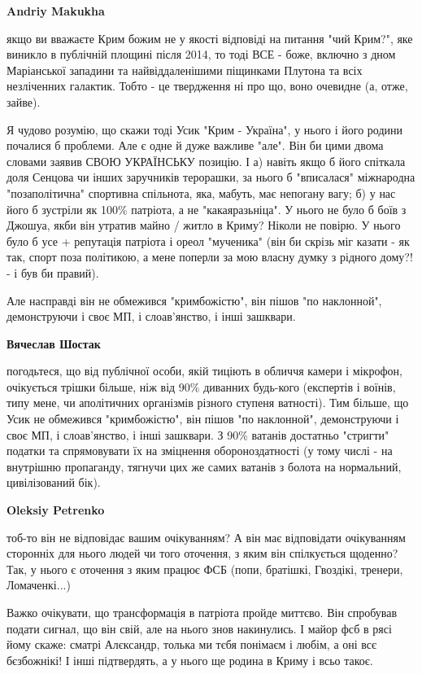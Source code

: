 \begin{itemize}
\begin{itemize}
\textbf{Andriy Makukha} 

якщо ви вважаєте Крим божим не у якості відповіді на питання "чий Крим?", яке
виникло в публічній площині після 2014, то тоді ВСЕ - боже, включно з дном
Маріанської западини та найвіддаленішими піщинками Плутона та всіх незліченних
галактик. Тобто - це твердження ні про що, воно очевидне (а, отже, зайве).

Я чудово розумію, що скажи тоді Усик "Крим - Україна", у нього і його родини
почалися б проблеми. Але є одне й дуже важливе "але". Він би цими двома словами
заявив СВОЮ УКРАЇНСЬКУ позицію. І а) навіть якщо б його спіткала доля Сенцова
чи інших заручників терорашки, за нього б "вписалася" міжнародна
"позаполітична" спортивна спільнота, яка, мабуть, має непогану вагу; б) у нас
його б зустріли як 100\% патріота, а не "какаяразьніца". У нього не було б боїв
з Джошуа, якби він утратив майно / житло в Криму? Ніколи не повірю. У нього
було б усе + репутація патріота і ореол "мученика" (він би скрізь міг казати -
як так, спорт поза політикою, а мене поперли за мою власну думку з рідного
дому?! - і був би правий).

Але насправді він не обмежився "кримбожістю", він пішов "по наклонной",
демонструючи і своє МП, і слоав'янство, і інші зашквари.

\textbf{Вячеслав Шостак} 

погодьтеся, що від публічної особи, якій тиціють в обличчя камери і мікрофон,
очікується трішки більше, ніж від 90\% диванних будь-кого (експертів і воїнів,
типу мене, чи аполітичних організмів різного ступеня ватності). Тим більше, що
Усик не обмежився "кримбожістю", він пішов "по наклонной", демонструючи і своє
МП, і слоав'янство, і інші зашквари. З 90\% ватанів достатньо "стригти" податки
та спрямовувати їх на зміцнення обороноздатності (у тому числі - на внутрішню
пропаганду, тягнучи цих же самих ватанів з болота на нормальний, цивілізований
бік).

\textbf{Oleksiy Petrenko} 

тоб-то він не відповідає вашим очікуванням? А він має відповідати очікуванням
сторонніх для нього людей чи того оточення, з яким він спілкується щоденно?
Так, у нього є оточення з яким працює ФСБ (попи, братішкі, Гвоздікі, тренери,
Ломаченкі...)

Важко очікувати, що трансформація в патріота пройде миттєво. Він спробував
подати сигнал, що він свій, але на нього знов накинулись. І майор фсб в рясі
йому скаже: сматрі Алєксандр, толька ми тєбя понімаєм і любім, а оні всє
бєзбожнікі! І інші підтвердять, а у нього ще родина в Криму і всьо такоє.


\end{itemize}
\end{itemize}
